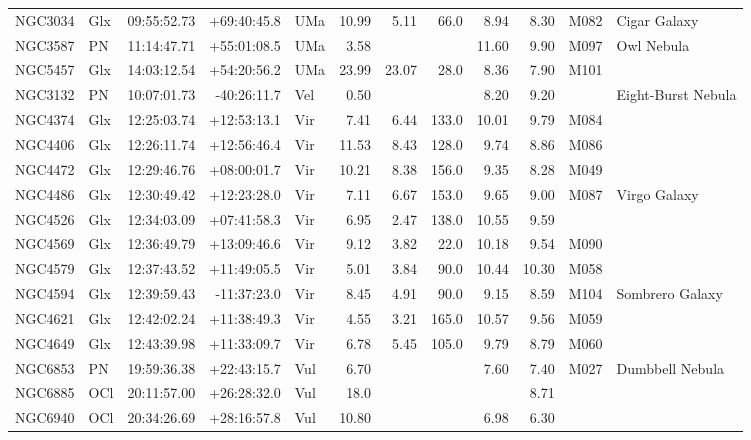 \documentclass[11pt]{article}
\begin{document}
\begin{longtable}{llrrlrrrrrrl}
  NGC3034 & Glx     & 09:55:52.73 & +69:40:45.8 & UMa & 10.99  & 5.11   & 66.0  & 8.94  & 8.30   & M082 & Cigar Galaxy \\
  NGC3587 & PN      & 11:14:47.71 & +55:01:08.5 & UMa & 3.58   &        &       & 11.60 & 9.90   & M097 & Owl Nebula \\
  NGC5457 & Glx     & 14:03:12.54 & +54:20:56.2 & UMa & 23.99  & 23.07  & 28.0  & 8.36  & 7.90   & M101 & \\
  NGC3132 & PN      & 10:07:01.73 & -40:26:11.7 & Vel & 0.50   &        &       & 8.20  & 9.20   &      & Eight-Burst Nebula \\
  NGC4374 & Glx     & 12:25:03.74 & +12:53:13.1 & Vir & 7.41   & 6.44   & 133.0 & 10.01 & 9.79   & M084 & \\
  NGC4406 & Glx     & 12:26:11.74 & +12:56:46.4 & Vir & 11.53  & 8.43   & 128.0 & 9.74  & 8.86   & M086 & \\
  NGC4472 & Glx     & 12:29:46.76 & +08:00:01.7 & Vir & 10.21  & 8.38   & 156.0 & 9.35  & 8.28   & M049 & \\
  NGC4486 & Glx     & 12:30:49.42 & +12:23:28.0 & Vir & 7.11   & 6.67   & 153.0 & 9.65  & 9.00   & M087 & Virgo Galaxy \\
  NGC4526 & Glx     & 12:34:03.09 & +07:41:58.3 & Vir & 6.95   & 2.47   & 138.0 & 10.55 & 9.59   &      & \\
  NGC4569 & Glx     & 12:36:49.79 & +13:09:46.6 & Vir & 9.12   & 3.82   & 22.0  & 10.18 & 9.54   & M090 & \\
  NGC4579 & Glx     & 12:37:43.52 & +11:49:05.5 & Vir & 5.01   & 3.84   & 90.0  & 10.44 & 10.30  & M058 & \\
  NGC4594 & Glx     & 12:39:59.43 & -11:37:23.0 & Vir & 8.45   & 4.91   & 90.0  & 9.15  & 8.59   & M104 & Sombrero Galaxy \\
  NGC4621 & Glx     & 12:42:02.24 & +11:38:49.3 & Vir & 4.55   & 3.21   & 165.0 & 10.57 & 9.56   & M059 & \\
  NGC4649 & Glx     & 12:43:39.98 & +11:33:09.7 & Vir & 6.78   & 5.45   & 105.0 & 9.79  & 8.79   & M060 & \\
  NGC6853 & PN      & 19:59:36.38 & +22:43:15.7 & Vul & 6.70   &        &       & 7.60  & 7.40   & M027 & Dumbbell Nebula \\
  NGC6885 & OCl     & 20:11:57.00 & +26:28:32.0 & Vul & 18.0   &        &       &       & 8.71   &      & \\
  NGC6940 & OCl     & 20:34:26.69 & +28:16:57.8 & Vul & 10.80  &        &       & 6.98  & 6.30   &      & \\
\bottomrule
\end{longtable}
\end{document}
